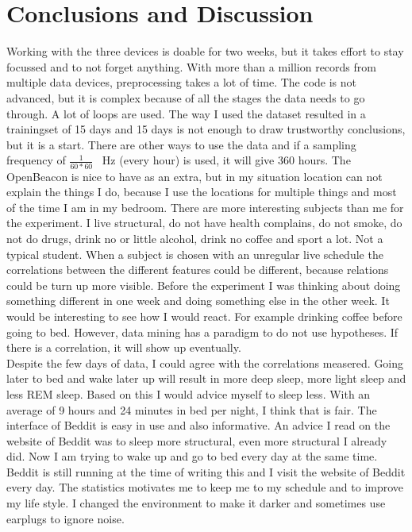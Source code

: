 \section{Conclusions and Discussion}
	Working with the three devices is doable for two weeks, but it takes effort to stay focussed and to not forget anything. With more than a million records from multiple data devices, preprocessing takes a lot of time. The code is not advanced, but it is complex because of all the stages the data needs to go through. A lot of loops are used. The way I used the dataset resulted in a trainingset of 15 days and 15 days is not enough to draw trustworthy conclusions, but it is a start. There are other ways to use the data and if a sampling frequency of $\frac{1}{60 * 60}$ \SI{}{\hertz} (every hour) is used, it will give 360 hours. The OpenBeacon is nice to have as an extra, but in my situation location can not explain the things I do, because I use the locations for multiple things and most of the time I am in my bedroom. 
	There are more interesting subjects than me for the experiment. I live structural, do not have health complains, do not smoke, do not do drugs, drink no or little alcohol, drink no coffee and sport a lot. Not a typical student. When a subject is chosen with an unregular live schedule the correlations between the different features could be different, because relations could be turn up more visible. Before the experiment I was thinking about doing something different in one week and doing something else in the other week. It would be interesting to see how I would react. For example drinking coffee before going to bed. However, data mining has a paradigm to do not use hypotheses. If there is a correlation, it will show up eventually.
	\\
	Despite the few days of data, I could agree with the correlations measered. Going later to bed and wake later up will result in more deep sleep, more light sleep and less REM sleep. Based on this I would advice myself to sleep less. With an average of 9 hours and 24 minutes in bed per night, I think that is fair. The interface of Beddit is easy in use and also informative. An advice I read on the website of Beddit was to sleep more structural, even more structural I already did. Now I am trying to wake up and go to bed every day at the same time. Beddit is still running at the time of writing this and I visit the website of Beddit every day. The statistics motivates me to keep me to my schedule and to improve my life style. I changed the environment to make it darker and sometimes use earplugs to ignore noise. 
